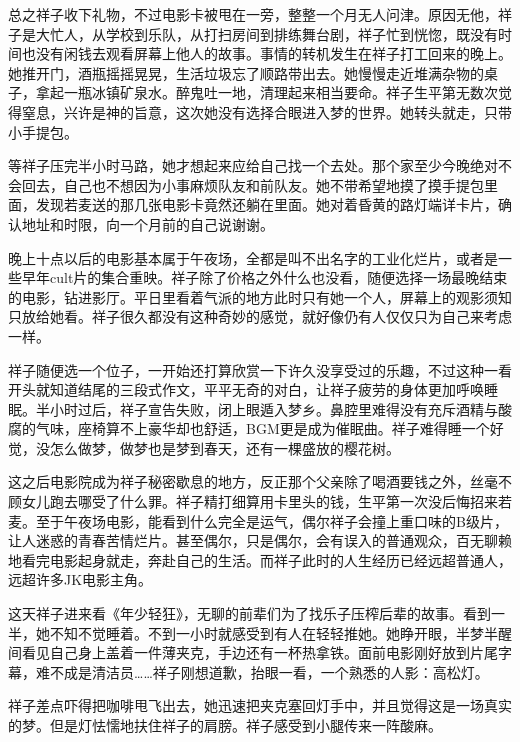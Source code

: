 \documentclass{article}
\begin{document}
总之祥子收下礼物，不过电影卡被甩在一旁，整整一个月无人问津。原因无他，祥子是大忙人，从学校到乐队，从打扫房间到排练舞台剧，祥子忙到恍惚，既没有时间也没有闲钱去观看屏幕上他人的故事。事情的转机发生在祥子打工回来的晚上。她推开门，酒瓶摇摇晃晃，生活垃圾忘了顺路带出去。她慢慢走近堆满杂物的桌子，拿起一瓶冰镇矿泉水。醉鬼吐一地，清理起来相当要命。祥子生平第无数次觉得窒息，兴许是神的旨意，这次她没有选择合眼进入梦的世界。她转头就走，只带小手提包。



等祥子压完半小时马路，她才想起来应给自己找一个去处。那个家至少今晚绝对不会回去，自己也不想因为小事麻烦队友和前队友。她不带希望地摸了摸手提包里面，发现若麦送的那几张电影卡竟然还躺在里面。她对着昏黄的路灯端详卡片，确认地址和时限，向一个月前的自己说谢谢。



晚上十点以后的电影基本属于午夜场，全都是叫不出名字的工业化烂片，或者是一些早年cult片的集合重映。祥子除了价格之外什么也没看，随便选择一场最晚结束的电影，钻进影厅。平日里看着气派的地方此时只有她一个人，屏幕上的观影须知只放给她看。祥子很久都没有这种奇妙的感觉，就好像仍有人仅仅只为自己来考虑一样。



祥子随便选一个位子，一开始还打算欣赏一下许久没享受过的乐趣，不过这种一看开头就知道结尾的三段式作文，平平无奇的对白，让祥子疲劳的身体更加呼唤睡眠。半小时过后，祥子宣告失败，闭上眼遁入梦乡。鼻腔里难得没有充斥酒精与酸腐的气味，座椅算不上豪华却也舒适，BGM更是成为催眠曲。祥子难得睡一个好觉，没怎么做梦，做梦也是梦到春天，还有一棵盛放的樱花树。



这之后电影院成为祥子秘密歇息的地方，反正那个父亲除了喝酒要钱之外，丝毫不顾女儿跑去哪受了什么罪。祥子精打细算用卡里头的钱，生平第一次没后悔招来若麦。至于午夜场电影，能看到什么完全是运气，偶尔祥子会撞上重口味的B级片，让人迷惑的青春苦情烂片。甚至偶尔，只是偶尔，会有误入的普通观众，百无聊赖地看完电影起身就走，奔赴自己的生活。而祥子此时的人生经历已经远超普通人，远超许多JK电影主角。



这天祥子进来看《年少轻狂》，无聊的前辈们为了找乐子压榨后辈的故事。看到一半，她不知不觉睡着。不到一小时就感受到有人在轻轻推她。她睁开眼，半梦半醒间看见自己身上盖着一件薄夹克，手边还有一杯热拿铁。面前电影刚好放到片尾字幕，难不成是清洁员……祥子刚想道歉，抬眼一看，一个熟悉的人影：高松灯。



祥子差点吓得把咖啡甩飞出去，她迅速把夹克塞回灯手中，并且觉得这是一场真实的梦。但是灯怯懦地扶住祥子的肩膀。祥子感受到小腿传来一阵酸麻。
\end{document}
